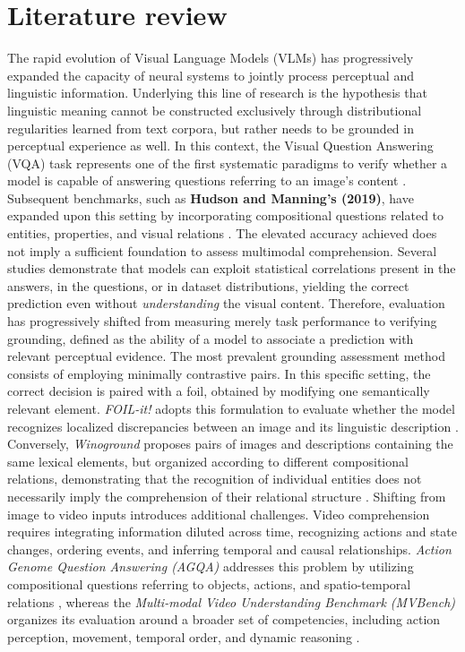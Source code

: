 \chapter{Literature review}
\label{ch:LiteratureReview}

The rapid evolution of Visual Language Models (VLMs) has progressively expanded the capacity of neural systems to jointly process perceptual and linguistic information.
Underlying this line of research is the hypothesis that linguistic meaning cannot be constructed exclusively through distributional regularities learned from text corpora, but rather needs to be grounded in perceptual experience as well\cite{baroni2015grounding}.
In this context, the Visual Question Answering (VQA) task represents one of the first systematic paradigms to verify whether a model is capable of answering questions referring to an image's content \cite{antol2015vqa}.
Subsequent benchmarks, such as \textbf{Hudson and Manning's (2019)}, have expanded upon this setting by incorporating compositional questions related to entities, properties, and visual relations \cite{hudson2019gqa}.
The elevated accuracy achieved does not imply a sufficient foundation to assess multimodal comprehension. Several studies demonstrate that models can exploit statistical correlations present in the answers, in the questions, or in dataset distributions, yielding the correct prediction even without \textit{understanding} the visual content.
Therefore, evaluation has progressively shifted from measuring merely task performance to verifying grounding, defined as the ability of a model to associate a prediction with relevant perceptual evidence.
The most prevalent grounding assessment method consists of employing minimally contrastive pairs. In this specific setting, the correct decision is paired with a foil, obtained by modifying one semantically relevant element. \textit{FOIL-it!} adopts this formulation to evaluate whether the model recognizes localized discrepancies between an image and its linguistic description \cite{shekhar2017foilit}.
Conversely, \textit{Winoground} proposes pairs of images and descriptions containing the same lexical elements, but organized according to different compositional relations, demonstrating that the recognition of individual entities does not necessarily imply the comprehension of their relational structure \cite{thrush2022winoground}.
Shifting from image to video inputs introduces additional challenges. Video comprehension requires integrating information diluted across time, recognizing actions and state changes, ordering events, and inferring temporal and causal relationships. \textit{Action Genome Question Answering (AGQA)} addresses this problem by utilizing compositional questions referring to objects, actions, and spatio-temporal relations \cite{grundemclaughlin2021agqa}, whereas the \textit{Multi-modal Video Understanding Benchmark (MVBench)} organizes its evaluation around a broader set of competencies, including action perception, movement, temporal order, and dynamic reasoning \cite{li2024mvbench}.
